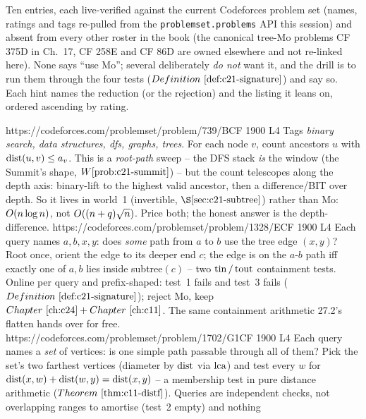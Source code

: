 
Ten entries, each live-verified against the current Codeforces problem set (names,
ratings and tags re-pulled from the \texttt{problemset.problems} API this session) and
absent from every other roster in the book (the canonical tree-Mo problems CF 375D in
Ch.~17, CF 258E and CF 86D are owned elsewhere and not re-linked here). None says
``use Mo''; several deliberately \emph{do not} want it, and the drill is to run them
through the four tests (\(\defref{c21-signature}\)) and say so. Each hint names the
reduction (or the rejection) and the listing it leans on, ordered ascending by rating.

\begin{mixedset}
    {https://codeforces.com/problemset/problem/739/B}{CF 1900 L4}
    {Tags \emph{binary search, data structures, dfs, graphs, trees}. For each node \(v\),
     count ancestors \(u\) with \(\operatorname{dist}(u,v)\le a_v\). This is a \emph{root-path} sweep --
     the DFS stack \emph{is} the window (the Summit's shape, \(\probref{c21-summit}\)) --
     but the count telescopes along the depth axis: binary-lift to the highest valid
     ancestor, then a difference/BIT over depth. So it lives in world~1 (invertible,
     \(\secref{c21-subtree}\)) rather than Mo: \(O(n\log n)\), not
     \(O((n+q)\sqrt n)\). Price both; the honest answer is the depth-difference.}
    {https://codeforces.com/problemset/problem/1328/E}{CF 1900 L4}
    {Each query names \(a,b,x,y\): does \emph{some} path from \(a\) to \(b\) use the tree
     edge \((x,y)\)? Root once, orient the edge to its deeper end \(c\); the edge is on
     the \(a\)-\(b\) path iff exactly one of \(a,b\) lies inside subtree\((c)\) -- two
     \(\operatorname{tin}/\operatorname{tout}\) containment tests. Online per query and prefix-shaped: test~1 fails
     and test~3 fails (\(\defref{c21-signature}\)); reject Mo, keep
     \(\chref{c24}+\chref{c11}\). The same containment arithmetic 27.2's flatten hands
     over for free.}
    {https://codeforces.com/problemset/problem/1702/G1}{CF 1900 L4}
    {Each query names a \emph{set} of vertices: is one simple path passable through all
     of them? Pick the set's two farthest vertices (diameter by \(\operatorname{dist}\) via
     \(\operatorname{lca}\)) and test every \(w\) for \(\operatorname{dist}(x,w)+\operatorname{dist}(w,y)=\operatorname{dist}(x,y)\) -- a
     membership test in pure distance arithmetic (\(\thmref{c11-distf}\)). Queries are
     independent checks, not overlapping ranges to amortise (test~2 empty) and nothing
}
\end{mixedset}
